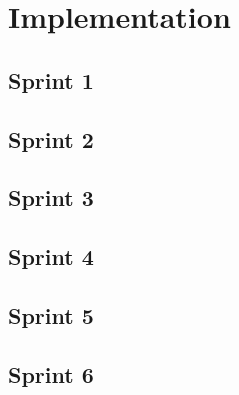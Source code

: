 \section{Implementation}


\subsection{Sprint 1}
\subsection{Sprint 2}
\subsection{Sprint 3}
\subsection{Sprint 4}
\subsection{Sprint 5}
\subsection{Sprint 6}